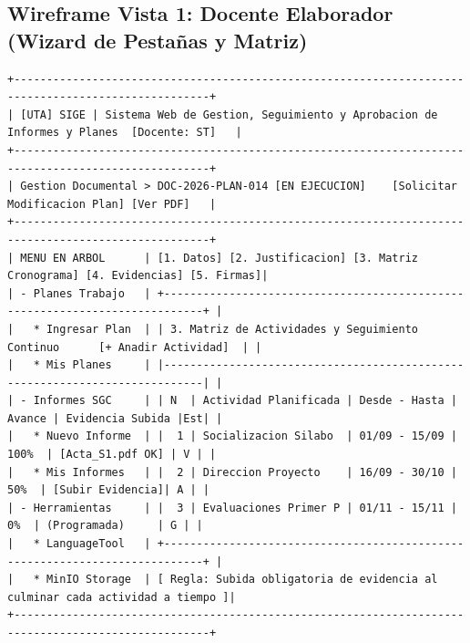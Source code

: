 \documentclass[12pt,a4paper]{article}
\begin{document}
\subsection{Wireframe Vista 1: Docente Elaborador (Wizard de Pestañas y Matriz)}
\begin{lstlisting}
+----------------------------------------------------------------------------------------------------+
| [UTA] SIGE | Sistema Web de Gestion, Seguimiento y Aprobacion de Informes y Planes  [Docente: ST]   |
+----------------------------------------------------------------------------------------------------+
| Gestion Documental > DOC-2026-PLAN-014 [EN EJECUCION]    [Solicitar Modificacion Plan] [Ver PDF]   |
+----------------------------------------------------------------------------------------------------+
| MENU EN ARBOL      | [1. Datos] [2. Justificacion] [3. Matriz Cronograma] [4. Evidencias] [5. Firmas]|
| - Planes Trabajo   | +----------------------------------------------------------------------------+ |
|   * Ingresar Plan  | | 3. Matriz de Actividades y Seguimiento Continuo      [+ Anadir Actividad]  | |
|   * Mis Planes     | |----------------------------------------------------------------------------| |
| - Informes SGC     | | N  | Actividad Planificada | Desde - Hasta | Avance | Evidencia Subida |Est| |
|   * Nuevo Informe  | |  1 | Socializacion Silabo  | 01/09 - 15/09 |  100%  | [Acta_S1.pdf OK] | V | |
|   * Mis Informes   | |  2 | Direccion Proyecto    | 16/09 - 30/10 |   50%  | [Subir Evidencia]| A | |
| - Herramientas     | |  3 | Evaluaciones Primer P | 01/11 - 15/11 |    0%  | (Programada)     | G | |
|   * LanguageTool   | +----------------------------------------------------------------------------+ |
|   * MinIO Storage  | [ Regla: Subida obligatoria de evidencia al culminar cada actividad a tiempo ]|
+----------------------------------------------------------------------------------------------------+
\end{lstlisting}
\end{document}
